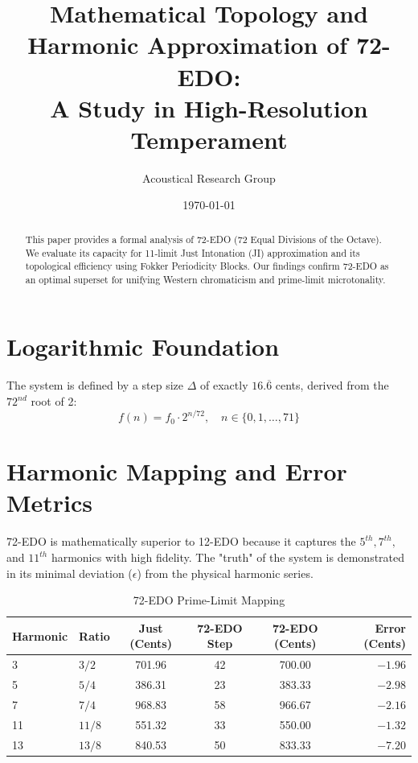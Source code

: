 \documentclass[12pt, a4paper]{article}
\title{Mathematical Topology and Harmonic Approximation of 72-EDO: \\ \large A Study in High-Resolution Temperament}
\author{Acoustical Research Group}
\date{\today}
\begin{document}
\maketitle

\begin{abstract}
This paper provides a formal analysis of 72-EDO (72 Equal Divisions of the Octave). We evaluate its capacity for 11-limit Just Intonation (JI) approximation and its topological efficiency using Fokker Periodicity Blocks. Our findings confirm 72-EDO as an optimal superset for unifying Western chromaticism and prime-limit microtonality.
\end{abstract}

\section{Logarithmic Foundation}
The system is defined by a step size $\Delta$ of exactly $16.\overline{6}$ cents, derived from the $72^{nd}$ root of 2:
\begin{equation}
f(n) = f_0 \cdot 2^{n/72}, \quad n \in \{0, 1, \dots, 71\}
\end{equation}

\section{Harmonic Mapping and Error Metrics}
72-EDO is mathematically superior to 12-EDO because it captures the $5^{th}, 7^{th},$ and $11^{th}$ harmonics with high fidelity. The "truth" of the system is demonstrated in its minimal deviation ($\epsilon$) from the physical harmonic series.



\begin{table}[h!]
\centering
\caption{72-EDO Prime-Limit Mapping}
\label{tab:harmonics}
\begin{tabular}{@{}llcccr@{}}
\toprule
Harmonic & Ratio & Just (Cents) & 72-EDO Step & 72-EDO (Cents) & Error (Cents) \\ \midrule
3  & $3/2$   & 701.96  & 42 & 700.00  & $-1.96$ \\
5  & $5/4$   & 386.31  & 23 & 383.33  & $-2.98$ \\
7  & $7/4$   & 968.83  & 58 & 966.67  & $-2.16$ \\
11 & $11/8$  & 551.32  & 33 & 550.00  & $-1.32$ \\
13 & $13/8$  & 840.53  & 50 & 833.33  & $-7.20$ \\ \bottomrule
\end{tabular}
\end{table}
\end{document}

